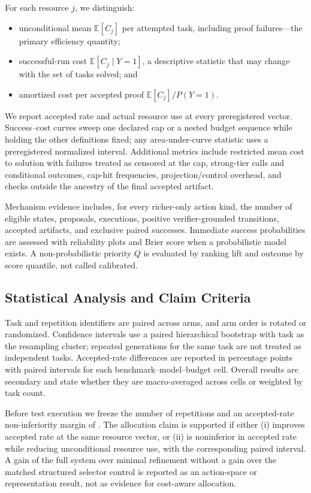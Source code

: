For each resource \(j\), we distinguish:

\begin{itemize}
    \item unconditional mean \(\mathbb E[C_j]\) per attempted task, including
    proof failures---the primary efficiency quantity;
    \item successful-run cost \(\mathbb E[C_j\mid Y=1]\), a descriptive
    statistic that may change with the set of tasks solved; and
    \item amortized cost per accepted proof
    \(\mathbb E[C_j]/P(Y=1)\).
\end{itemize}

We report accepted rate and actual resource use at every preregistered vector.
Success--cost curves sweep one declared cap or a nested budget sequence while
holding the other definitions fixed; any area-under-curve statistic uses a
preregistered normalized interval. Additional metrics include restricted mean
cost to solution with failures treated as censored at the cap, strong-tier
calls and conditional outcomes, cap-hit frequencies, projection/control
overhead, and checks outside the ancestry of the final accepted artifact.

Mechanism evidence includes, for every richer-only action kind, the number of
eligible states, proposals, executions, positive verifier-grounded transitions,
accepted artifacts, and exclusive paired successes. Immediate success
probabilities are assessed with reliability plots and Brier score when a
probabilistic model exists. A non-probabilistic priority \(Q\) is evaluated by
ranking lift and outcome by score quantile, not called calibrated.

\subsection{Statistical Analysis and Claim Criteria}

Task and repetition identifiers are paired across arms, and arm order is
rotated or randomized. Confidence intervals use a paired hierarchical
bootstrap with task as the resampling cluster; repeated generations for the
same task are not treated as independent tasks. Accepted-rate differences are
reported in percentage points with paired intervals for each
benchmark--model--budget cell. Overall results are secondary and state whether
they are macro-averaged across cells or weighted by task count.

Before test execution we freeze the number of repetitions and an accepted-rate
non-inferiority margin of . The allocation claim is supported if \system{} either
(i) improves accepted rate at the same resource vector, or (ii) is noninferior
in accepted rate while reducing unconditional resource use, with the
corresponding paired interval. A gain of the full system over minimal refinement
without a gain over the matched structured selector control is reported as an
action-space or representation result, not as evidence for cost-aware
allocation.

